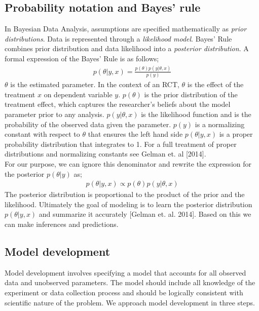 \documentclass{article}
\begin{document}
\subsection{Probability notation and Bayes' rule}
In Bayesian Data Analysis, assumptions are specified mathematically as \textit{prior distributions}.  Data is represented through a \textit{likelihood model}. Bayes' Rule combines prior distribution and data likelihood into a \textit{posterior distribution}.  A formal expression of the Bayes' Rule is as follows;
\begin{align}
{p(\theta| y, x) = \frac{ p(\theta) p(y|\theta, x)}{p(y)}}
\end{align}
$\theta$ is the estimated parameter. In the context of an RCT, $\theta$ is the effect of the treatment $x$ on dependent variable $y$. $p(\theta)$ is the prior distribution of the treatment effect, which captures the researcher's beliefs about the model parameter prior to any analysis. $p(y | \theta, x)$ is the likelihood function and is the probability of the observed data given the parameter.  $p(y)$ is a normalizing constant with respect to $\theta$ that ensures the left hand side $p(\theta |y, x)$ is a proper probability distribution that integrates to 1. For a full treatment of proper distributions and normalizing constants see Gelman et. al [2014]. \\
For our purpose, we can ignore this denominator and rewrite the expression for the posterior $p(\theta | y)$ as;
 \begin{align}
 p(\theta | y, x) \propto p(\theta) p(y |\theta, x)
 \end{align}
The posterior distribution is proportional to the product of the prior and the likelihood. Ultimately the goal of modeling is to learn the posterior distribution $p(\theta|y, x)$ and summarize it accurately [Gelman et. al. 2014]. Based on this we can make inferences and predictions.

\subsection{Model development}
Model development involves specifying a model that accounts for all observed data and unobserved parameters. The model should include all knowledge of the experiment or data collection process and should be logically consistent with scientific nature of the problem. We approach model development in three steps.
\end{document}
